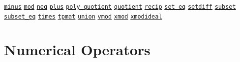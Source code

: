 \begin{list}{}
\hyperlink{operator:MINUS}{\texttt{minus}}
\hyperlink{operator:MOD}{\texttt{mod}}
\hyperlink{operator:NEQ}{\texttt{neq}}
\hyperlink{operator:PLUS}{\texttt{plus}}
\hyperlink{operator:POLY_QUOTIENT}{\texttt{poly\_quotient}}
\hyperlink{operator:QUOTIENT}{\texttt{quotient}}
\hyperlink{operator:RECIP}{\texttt{recip}}
\hyperlink{operator:SET_EQ}{\texttt{set\_eq}}
\hyperlink{operator:SETDIFF}{\texttt{setdiff}}
\hyperlink{operator:SUBSET}{\texttt{subset}}
\hyperlink{operator:SUBSET_EQ}{\texttt{subset\_eq}}
\hyperlink{operator:TIMES}{\texttt{times}}
\hyperlink{operator:TPMAT}{\texttt{tpmat}}
\hyperlink{operator:SETS_UNION}{\texttt{union}}
\hyperlink{operator:VMOD}{\texttt{vmod}}
\hyperlink{operator:XMOD}{\texttt{xmod}}
\hyperlink{operator:XMODIDEAL}{\texttt{xmodideal}}
\halfinterwordspace

\section{Numerical Operators}


\end{list}
